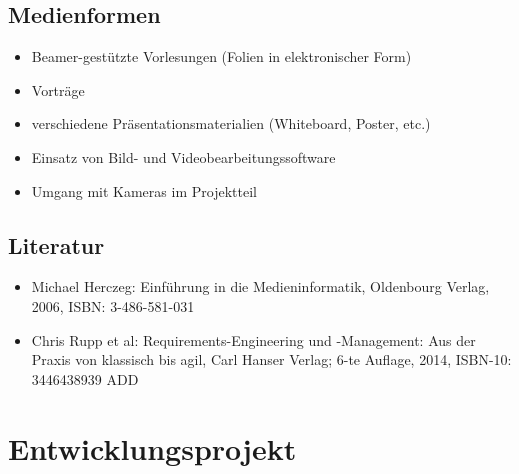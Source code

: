 \hypertarget{medienformenpathlabelmi-2017modulbeschreibungen-bachelorba_einfhrungindiemedieninformatik}{%
\section*{Medienformen\label{/mi-2017/modulbeschreibungen-bachelor/BA_EinfhrungindieMedieninformatik}}\label{medienformenpathlabelmi-2017modulbeschreibungen-bachelorba_einfhrungindiemedieninformatik}}

\begin{itemize}
\tightlist
\item
  Beamer-gestützte Vorlesungen (Folien in elektronischer Form)
\item
  Vorträge
\item
  verschiedene Präsentationsmaterialien (Whiteboard, Poster, etc.)
\item
  Einsatz von Bild- und Videobearbeitungssoftware
\item
  Umgang mit Kameras im Projektteil
\end{itemize}

\hypertarget{literaturpathlabelmi-2017modulbeschreibungen-bachelorba_einfhrungindiemedieninformatik}{%
\section*{Literatur\label{/mi-2017/modulbeschreibungen-bachelor/BA_EinfhrungindieMedieninformatik}}\label{literaturpathlabelmi-2017modulbeschreibungen-bachelorba_einfhrungindiemedieninformatik}}

\begin{itemize}
\tightlist
\item
  Michael Herczeg: Einführung in die Medieninformatik, Oldenbourg
  Verlag, 2006, ISBN: 3-486-581-031
\item
  Chris Rupp et al: Requirements-Engineering und -Management: Aus der
  Praxis von klassisch bis agil, Carl Hanser Verlag; 6-te Auflage, 2014,
  ISBN-10: 3446438939 ADD
\end{itemize}

\hypertarget{entwicklungsprojektpathlabelmi-2017modulbeschreibungen-bachelorba_entwicklungsprojekt}{%
\chapter{Entwicklungsprojekt\label{/mi-2017/modulbeschreibungen-bachelor/BA_Entwicklungsprojekt}}\label{entwicklungsprojektpathlabelmi-2017modulbeschreibungen-bachelorba_entwicklungsprojekt}}

